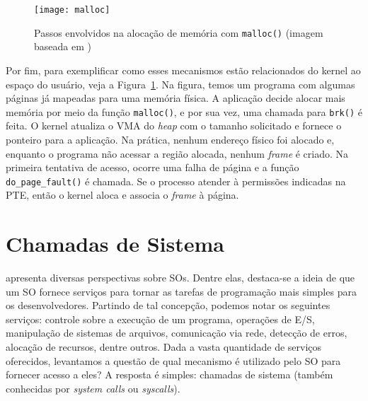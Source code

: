 %

\begin{figure}[!h]
  \centering
  \texttt{[image: malloc]}
  \caption[Passos envolvidos na alocação de memória com \texttt{malloc()}]{Passos envolvidos na alocação de memória com \texttt{malloc()} (imagem baseada em \cite{anatomy_program_mem})}
  \label{fig:malloc_linux}
\end{figure}

Por fim, para exemplificar como esses mecanismos estão relacionados do kernel ao
espaço do usuário, veja a Figura~\ref{fig:malloc_linux}. Na figura, temos um programa com
algumas páginas já mapeadas para uma memória física. A aplicação decide alocar
mais memória por meio da função \texttt{malloc()}, e por sua vez, uma chamada
para \texttt{brk()} é feita. O kernel atualiza o VMA do \textit{heap} com o
tamanho solicitado e fornece o ponteiro para a aplicação. Na prática, nenhum
endereço físico foi alocado e, enquanto o programa não acessar a região alocada,
nenhum \emph{frame} é criado. Na primeira tentativa de acesso, ocorre uma falha
de página e a função \texttt{do\_page\_fault()} é chamada. Se o processo
atender à permissões indicadas na PTE, então o kernel aloca e associa o
\emph{frame} à página.

\section{Chamadas de Sistema}

\citet{silberschatz} apresenta diversas perspectivas sobre SOs. Dentre elas,
destaca-se a ideia de que um SO fornece serviços para tornar as tarefas de
programação mais simples para os desenvolvedores. Partindo de tal concepção,
podemos notar os seguintes serviços: controle sobre a execução de um programa,
operações de E/S, manipulação de sistemas de arquivos, comunicação via rede,
detecção de erros, alocação de recursos, dentre outros. Dada a vasta quantidade
de serviços oferecidos, levantamos a questão de qual mecanismo é utilizado pelo
SO para fornecer acesso a eles? A resposta é simples: chamadas de
sistema (também conhecidas por \emph{system calls} ou \emph{syscalls}).

